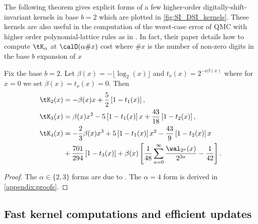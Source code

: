 \documentclass[acmsmall]{acmart}
\begin{document}
The following theorem gives explicit forms of a few higher-order digitally-shift-invariant kernels in base $b=2$ which are plotted in \cref{fig:SI_DSI_kernels}. These kernels are also useful in the computation of the worst-case error of QMC with higher order polynomial-lattice rules as in \citep{baldeaux.polylat_efficient_comp_worse_case_error_cbc}. In fact, their paper details how to compute $\tK_\alpha$ at $\calO(\alpha \#x)$ cost where $\#x$ is the number of non-zero digits in the base $b$ expansion of $x$
\begin{theorem} \label{thm:explicit_DSI_low_order_forms}
    Fix the base $b=2$. Let $\beta(x) = - \lfloor \log_2(x) \rfloor$ and $t_\nu(x) = 2^{-\nu \beta(x)}$ where for $x=0$ we set $\beta(x) = t_\nu(x) = 0$. Then 
    \begin{align*}
        \tK_2(x) &= -\beta(x) x + \frac{5}{2}\left[1-t_1(x)\right], \\
        \tK_3(x) &= \beta(x)x^2-5\left[1-t_1(x)\right]x+\frac{43}{18}\left[1-t_2(x)\right], \\
        \tK_4(x) &= - \frac{2}{3}\beta(x)x^3+5\left[1-t_1(x)\right]x^2 - \frac{43}{9}\left[1-t_2(x)\right]x \\
        &+\frac{701}{294}\left[1-t_3(x)\right]+\beta(x)\left[\frac{1}{48}\sum_{a=0}^\infty \frac{\wal_{2^a}(x)}{2^{3a}} - \frac{1}{42}\right].
    \end{align*}
\end{theorem}
\begin{proof}
    The $\alpha \in \{2,3\}$ forms are due to \citep{baldeaux.polylat_efficient_comp_worse_case_error_cbc}. The $\alpha=4$ form is derived in \cref{appendix:proofs}. 
\end{proof}


\subsection{Fast kernel computations and efficient updates} 
\end{document}
